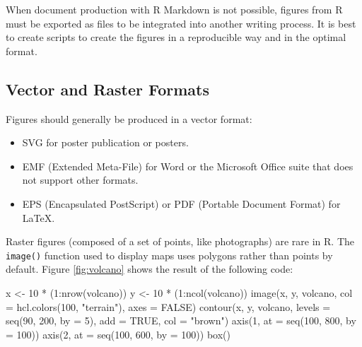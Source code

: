 \documentclass[
  12pt,
  american,
  a4paper,
  extrafontsizes,onecolumn,openright
  ]{memoir}
\newenvironment{Shaded}{\begin{snugshade}}{\end{snugshade}}
\newcommand{\AttributeTok}[1]{\textcolor[rgb]{0.77,0.63,0.00}{#1}}
\newcommand{\ConstantTok}[1]{\textcolor[rgb]{0.00,0.00,0.00}{#1}}
\newcommand{\DecValTok}[1]{\textcolor[rgb]{0.00,0.00,0.81}{#1}}
\newcommand{\FunctionTok}[1]{\textcolor[rgb]{0.00,0.00,0.00}{#1}}
\newcommand{\NormalTok}[1]{#1}
\newcommand{\OtherTok}[1]{\textcolor[rgb]{0.56,0.35,0.01}{#1}}
\newcommand{\SpecialCharTok}[1]{\textcolor[rgb]{0.00,0.00,0.00}{#1}}
\newcommand{\StringTok}[1]{\textcolor[rgb]{0.31,0.60,0.02}{#1}}
\providecommand{\tightlist}{%
  \setlength{\itemsep}{0pt}\setlength{\parskip}{0pt}}
\begin{document}
When document production with R Markdown is not possible, figures from R must be exported as files to be integrated into another writing process.
It is best to create scripts to create the figures in a reproducible way and in the optimal format.

\hypertarget{vector-and-raster-formats}{%
\subsection{Vector and Raster Formats}\label{vector-and-raster-formats}}

Figures should generally be produced in a vector format:

\begin{itemize}
\tightlist
\item
  SVG for poster publication or posters.
\item
  EMF (Extended Meta-File) for Word or the Microsoft Office suite that does not support other formats.
\item
  EPS (Encapsulated PostScript) or PDF (Portable Document Format) for LaTeX.
\end{itemize}

Raster figures (composed of a set of points, like photographs) are rare in R.
The \texttt{image()} function used to display maps uses polygons rather than points by default.
Figure \ref{fig:volcano} shows the result of the following code:



\scriptsize

\begin{Shaded}
\begin{Highlighting}[]
\NormalTok{x }\OtherTok{\textless{}{-}} \DecValTok{10} \SpecialCharTok{*}\NormalTok{ (}\DecValTok{1}\SpecialCharTok{:}\FunctionTok{nrow}\NormalTok{(volcano))}
\NormalTok{y }\OtherTok{\textless{}{-}} \DecValTok{10} \SpecialCharTok{*}\NormalTok{ (}\DecValTok{1}\SpecialCharTok{:}\FunctionTok{ncol}\NormalTok{(volcano))}
\FunctionTok{image}\NormalTok{(x, y, volcano, }\AttributeTok{col =} \FunctionTok{hcl.colors}\NormalTok{(}\DecValTok{100}\NormalTok{, }\StringTok{"terrain"}\NormalTok{), }\AttributeTok{axes =} \ConstantTok{FALSE}\NormalTok{)}
\FunctionTok{contour}\NormalTok{(x, y, volcano, }\AttributeTok{levels =} \FunctionTok{seq}\NormalTok{(}\DecValTok{90}\NormalTok{, }\DecValTok{200}\NormalTok{, }\AttributeTok{by =} \DecValTok{5}\NormalTok{), }\AttributeTok{add =} \ConstantTok{TRUE}\NormalTok{,}
    \AttributeTok{col =} \StringTok{"brown"}\NormalTok{)}
\FunctionTok{axis}\NormalTok{(}\DecValTok{1}\NormalTok{, }\AttributeTok{at =} \FunctionTok{seq}\NormalTok{(}\DecValTok{100}\NormalTok{, }\DecValTok{800}\NormalTok{, }\AttributeTok{by =} \DecValTok{100}\NormalTok{))}
\FunctionTok{axis}\NormalTok{(}\DecValTok{2}\NormalTok{, }\AttributeTok{at =} \FunctionTok{seq}\NormalTok{(}\DecValTok{100}\NormalTok{, }\DecValTok{600}\NormalTok{, }\AttributeTok{by =} \DecValTok{100}\NormalTok{))}
\FunctionTok{box}\NormalTok{()}
\end{Highlighting}
\end{Shaded}
\end{document}
